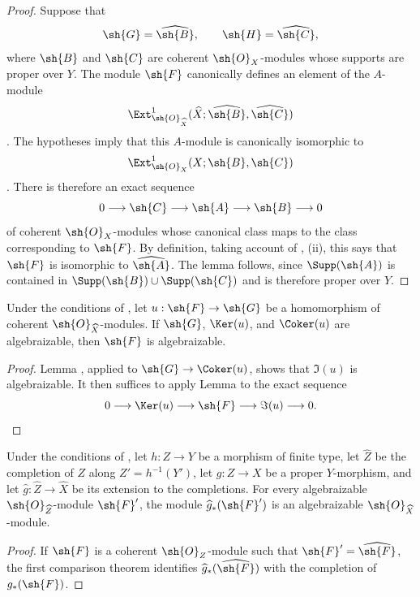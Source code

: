 \begin{proof}
Suppose that
\[
  \sh{G}=\widehat{\sh{B}},
  \qquad
  \sh{H}=\widehat{\sh{C}},
\]
where $\sh{B}$ and $\sh{C}$ are coherent $\sh{O}_X$-modules whose
supports are proper over $Y$.  The module $\sh{F}$ canonically
defines an element of the $A$-module
\[
  \Ext^1_{\sh{O}_{\widehat{X}}}
  (\widehat{X};\widehat{\sh{B}},\widehat{\sh{C}})
\]
.  The hypotheses imply that this $A$-module is
canonically isomorphic to
\[
  \Ext^1_{\sh{O}_X}(X;\sh{B},\sh{C})
\]
.  There is therefore an exact sequence
\[
  0\longrightarrow\sh{C}\longrightarrow\sh{A}
  \longrightarrow\sh{B}\longrightarrow0
\]
of coherent $\sh{O}_X$-modules whose canonical class maps to the
class corresponding to $\sh{F}$.  By definition, taking account of
, (ii), this says that $\sh{F}$ is isomorphic to
$\widehat{\sh{A}}$.  The lemma follows, since
$\Supp(\sh{A})$ is contained in
$\Supp(\sh{B})\cup\Supp(\sh{C})$ and is therefore proper over $Y$.
\end{proof}

\begin{corollary}[5.3.2]
\label{III.5.3.2}
Under the conditions of , let
$u:\sh{F}\to\sh{G}$ be a homomorphism of coherent
$\sh{O}_{\widehat{X}}$-modules.  If $\sh{G}$, $\Ker(u)$, and
$\Coker(u)$ are algebraizable, then $\sh{F}$ is algebraizable.
\end{corollary}

\begin{proof}
Lemma , applied to
$\sh{G}\to\Coker(u)$, shows that $\Im(u)$ is algebraizable.  It then
suffices to apply Lemma  to the exact sequence
\[
  0\longrightarrow\Ker(u)\longrightarrow\sh{F}
  \longrightarrow\Im(u)\longrightarrow0.
\]
\end{proof}

\begin{lemma}[5.3.3]
\label{III.5.3.3}
Under the conditions of , let $h:Z\to Y$ be a
morphism of finite type, let $\widehat{Z}$ be the completion of $Z$
along $Z'=h^{-1}(Y')$, let $g:Z\to X$ be a proper $Y$-morphism,
and let $\widehat{g}:\widehat{Z}\to\widehat{X}$ be its extension to
the completions.  For every algebraizable
$\sh{O}_{\widehat{Z}}$-module $\sh{F}'$, the module
$\widehat{g}_*(\sh{F}')$ is an algebraizable
$\sh{O}_{\widehat{X}}$-module.
\end{lemma}

\begin{proof}
If $\sh{F}$ is a coherent $\sh{O}_Z$-module such that
$\sh{F}'=\widehat{\sh{F}}$, the first comparison theorem
 identifies
$\widehat{g}_*(\widehat{\sh{F}})$ with the completion of
$g_*(\sh{F})$.
\end{proof}

